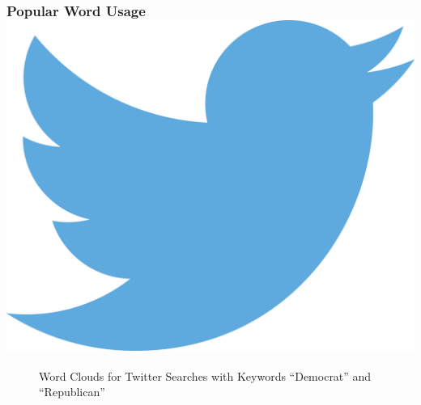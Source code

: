 \documentclass[xcolor=dvipsnames]{beamer}
\begin{document}
\begin{frame}
\frametitle{Popular Word Usage   \hfill \includegraphics[scale=.1]{twitterlogo.png}}
\begin{figure}[h!]
\hspace{1mm}
\caption{Word Clouds for Twitter Searches with Keywords ``Democrat'' and ``Republican''}
\end{figure}
\end{frame}
\end{document}
